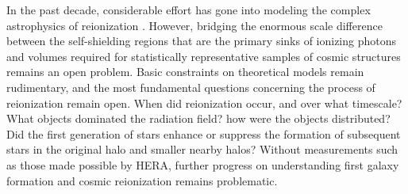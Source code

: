 \documentclass[preprint]{aastex}
\begin{document}
In the past decade, considerable effort has gone into modeling the complex astrophysics
of reionization
\citep{santos_et_al2010,mesinger_et_al2011,wyithe_loeb2004}. However, bridging the
enormous scale difference between the self-shielding regions that are the
primary sinks of ionizing photons and volumes required for statistically
representative samples of cosmic structures remains an open problem.  
Basic constraints on theoretical models remain rudimentary, and the most
fundamental questions concerning the process of reionization remain open. 
When did
reionization occur, and over what timescale?  What objects dominated the
radiation field? how were the objects distributed? Did the first generation of
stars enhance or suppress the formation of subsequent stars in the original
halo and smaller nearby halos? Without measurements such as those made possible by HERA,
further progress on understanding first galaxy formation and
cosmic reionization remains problematic. 
\end{document}
